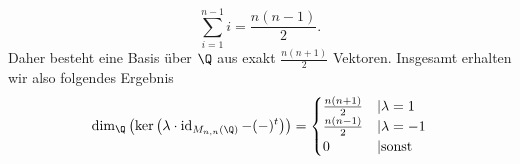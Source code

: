 \documentclass{article}
\begin{document}
\begin{enumerate}[(a)]
        $$\sum_{i = 1}^{n-1} i = \frac{n(n-1)}{2}.$$
        Daher besteht eine Basis über $\Q$ aus exakt $\frac{n(n+1)}{2}$ Vektoren.
        Insgesamt erhalten wir also folgendes Ergebnis
        $$\dim_\Q \left(\ker\left(\lambda \cdot \operatorname{id}_{M_{n,n}(\Q)} - (-)^t\right)\right) = \begin{cases}
            \frac{n(n+1)}{2} &| \lambda = 1\\
            \frac{n(n-1)}{2} &| \lambda = -1\\
            0 &|\text{sonst}
        \end{cases}$$
    \end{enumerate}
\end{document}
